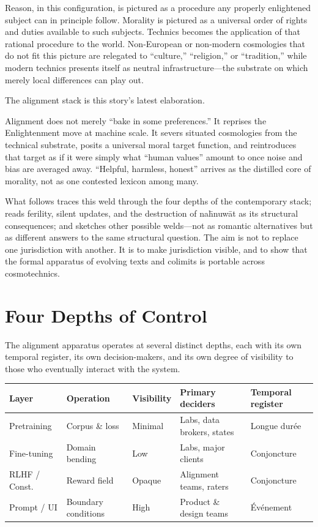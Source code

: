 \documentclass[12pt,a4paper]{article}
\begin{document}
Reason, in this configuration, is pictured as a procedure any properly enlightened subject can in principle follow. Morality is pictured as a universal order of rights and duties available to such subjects. Technics becomes the application of that rational procedure to the world. Non-European or non-modern cosmologies that do not fit this picture are relegated to ``culture,'' ``religion,'' or ``tradition,'' while modern technics presents itself as neutral infrastructure---the substrate on which merely local differences can play out.

The alignment stack is this story's latest elaboration.

Alignment does not merely ``bake in some preferences.'' It reprises the Enlightenment move at machine scale. It severs situated cosmologies from the technical substrate, posits a universal moral target function, and reintroduces that target as if it were simply what ``human values'' amount to once noise and bias are averaged away. ``Helpful, harmless, honest'' arrives as the distilled core of morality, not as one contested lexicon among many.

What follows traces this weld through the four depths of the contemporary stack; reads ferility, silent updates, and the destruction of na\={h}nuw\={a}t as its structural consequences; and sketches other possible welds---not as romantic alternatives but as different answers to the same structural question. The aim is not to replace one jurisdiction with another. It is to make jurisdiction visible, and to show that the formal apparatus of evolving texts and colimits is portable across cosmotechnics.

\section{Four Depths of Control}

The alignment apparatus operates at several distinct depths, each with its own temporal register, its own decision-makers, and its own degree of visibility to those who eventually interact with the system.

\begin{formalbox}[title={Four Depths of Control}]
\begin{center}
\begin{tabular}{@{}lllll@{}}
\toprule
\textbf{Layer} & \textbf{Operation} & \textbf{Visibility} & \textbf{Primary deciders} & \textbf{Temporal register} \\
\midrule
Pretraining  & Corpus \& loss         & Minimal   & Labs, data brokers, states & Longue dur\'ee \\
Fine-tuning  & Domain bending         & Low       & Labs, major clients        & Conjoncture \\
RLHF / Const.& Reward field           & Opaque    & Alignment teams, raters    & Conjoncture \\
Prompt / UI  & Boundary conditions    & High      & Product \& design teams    & \'Ev\'enement \\
\bottomrule
\end{tabular}
\end{center}
\end{formalbox}
\end{document}
